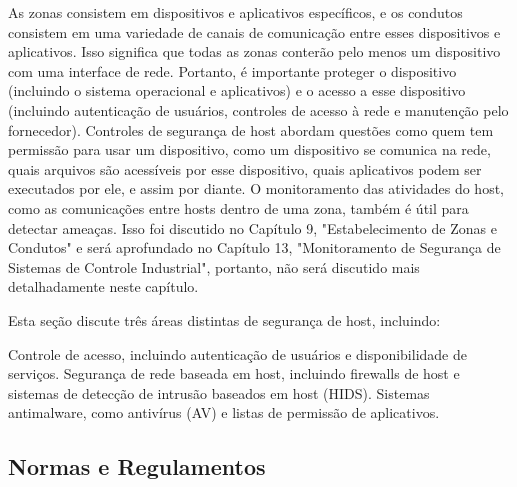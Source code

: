 As zonas consistem em dispositivos e aplicativos específicos, e os condutos consistem em uma variedade de canais de comunicação entre esses dispositivos e aplicativos. Isso significa que todas as zonas conterão pelo menos um dispositivo com uma interface de rede. Portanto, é importante proteger o dispositivo (incluindo o sistema operacional e aplicativos) e o acesso a esse dispositivo (incluindo autenticação de usuários, controles de acesso à rede e manutenção pelo fornecedor). Controles de segurança de host abordam questões como quem tem permissão para usar um dispositivo, como um dispositivo se comunica na rede, quais arquivos são acessíveis por esse dispositivo, quais aplicativos podem ser executados por ele, e assim por diante. O monitoramento das atividades do host, como as comunicações entre hosts dentro de uma zona, também é útil para detectar ameaças. Isso foi discutido no Capítulo 9, "Estabelecimento de Zonas e Condutos" e será aprofundado no Capítulo 13, "Monitoramento de Segurança de Sistemas de Controle Industrial", portanto, não será discutido mais detalhadamente neste capítulo.

Esta seção discute três áreas distintas de segurança de host, incluindo:

Controle de acesso, incluindo autenticação de usuários e disponibilidade de serviços.
Segurança de rede baseada em host, incluindo firewalls de host e sistemas de detecção de intrusão baseados em host (HIDS).
Sistemas antimalware, como antivírus (AV) e listas de permissão de aplicativos.

\subsection{Normas e Regulamentos}






